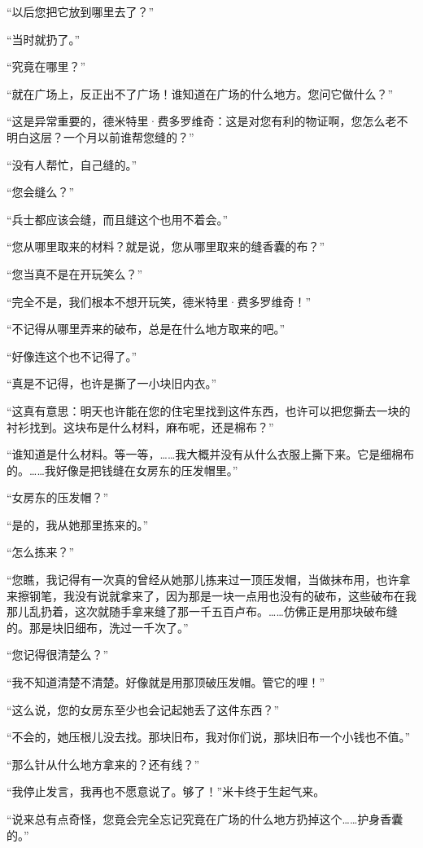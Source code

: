 \par “以后您把它放到哪里去了？”
\par “当时就扔了。”
\par “究竟在哪里？”
\par “就在广场上，反正出不了广场！谁知道在广场的什么地方。您问它做什么？”
\par “这是异常重要的，德米特里·费多罗维奇：这是对您有利的物证啊，您怎么老不明白这层？一个月以前谁帮您缝的？”
\par “没有人帮忙，自己缝的。”
\par “您会缝么？”
\par “兵士都应该会缝，而且缝这个也用不着会。”
\par “您从哪里取来的材料？就是说，您从哪里取来的缝香囊的布？”
\par “您当真不是在开玩笑么？”
\par “完全不是，我们根本不想开玩笑，德米特里·费多罗维奇！”
\par “不记得从哪里弄来的破布，总是在什么地方取来的吧。”
\par “好像连这个也不记得了。”
\par “真是不记得，也许是撕了一小块旧内衣。”
\par “这真有意思：明天也许能在您的住宅里找到这件东西，也许可以把您撕去一块的衬衫找到。这块布是什么材料，麻布呢，还是棉布？”
\par “谁知道是什么材料。等一等，……我大概并没有从什么衣服上撕下来。它是细棉布的。……我好像是把钱缝在女房东的压发帽里。”
\par “女房东的压发帽？”
\par “是的，我从她那里拣来的。”
\par “怎么拣来？”
\par “您瞧，我记得有一次真的曾经从她那儿拣来过一顶压发帽，当做抹布用，也许拿来擦钢笔，我没有说就拿来了，因为那是一块一点用也没有的破布，这些破布在我那儿乱扔着，这次就随手拿来缝了那一千五百卢布。……仿佛正是用那块破布缝的。那是块旧细布，洗过一千次了。”
\par “您记得很清楚么？”
\par “我不知道清楚不清楚。好像就是用那顶破压发帽。管它的哩！”
\par “这么说，您的女房东至少也会记起她丢了这件东西？”
\par “不会的，她压根儿没去找。那块旧布，我对你们说，那块旧布一个小钱也不值。”
\par “那么针从什么地方拿来的？还有线？”
\par “我停止发言，我再也不愿意说了。够了！”米卡终于生起气来。
\par “说来总有点奇怪，您竟会完全忘记究竟在广场的什么地方扔掉这个……护身香囊的。”

